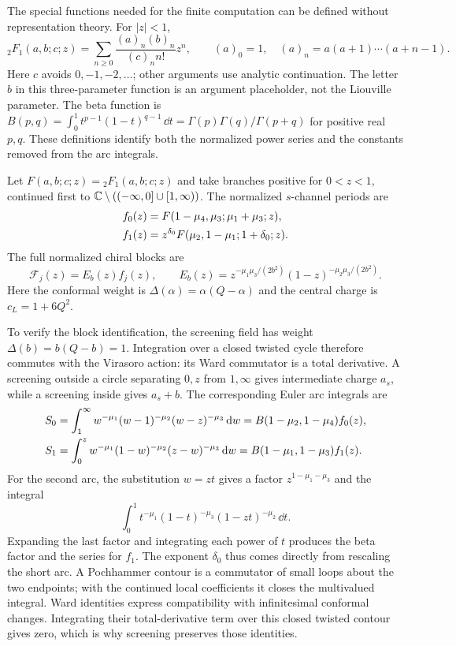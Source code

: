 The special functions needed for the finite computation can be
defined without representation theory. For $|z|<1$,
\[
 {}_2F_1(a,b;c;z)=\sum_{n\ge0}
       \frac{(a)_n(b)_n}{(c)_n n!}z^n,
 \qquad (a)_0=1,\quad (a)_n=a(a+1)\cdots(a+n-1).
\]
Here $c$ avoids $0,-1,-2,\ldots$; other arguments use analytic
continuation. The letter $b$ in this three-parameter function is
an argument placeholder, not the Liouville parameter.
The beta function is
$B(p,q)=\int_0^1t^{p-1}(1-t)^{q-1}\,\dd t
=\Gamma(p)\Gamma(q)/\Gamma(p+q)$ for positive real $p,q$.
These definitions identify both the normalized power series and
the constants removed from the arc integrals.

Let $F(a,b;c;z)={}_2F_1(a,b;c;z)$ and take branches positive
for $0<z<1$, continued first to
$\mathbb C\setminus(({-\infty},0]\cup[1,\infty))$.
The normalized $s$-channel periods are
\begin{align}
 f_0(z)&=F(1-\mu_4,\mu_3;\mu_1+\mu_3;z),\notag\\
 f_1(z)&=z^{\delta_0}
        F(\mu_2,1-\mu_1;1+\delta_0;z).
 \label{eq:screeningsbasis}
\end{align}
The full normalized chiral blocks are
\begin{equation}
 \mathcal F_j(z)=E_b(z)f_j(z),\qquad
 E_b(z)=z^{-\mu_1\mu_3/(2b^2)}
                  (1-z)^{-\mu_2\mu_3/(2b^2)}.
 \label{eq:screeningVirasoroblocks}
\end{equation}
Here the conformal weight is $\Delta(\alpha)=\alpha(Q-\alpha)$
and the central charge is $c_L=1+6Q^2$.

To verify the block identification, the screening field has
weight $\Delta(b)=b(Q-b)=1$. Integration over a closed twisted
cycle therefore commutes with the Virasoro action: its Ward
commutator is a total derivative. A screening outside a circle
separating $0,z$ from $1,\infty$ gives intermediate charge
$a_s$, while a screening inside gives $a_s+b$.
The corresponding Euler arc integrals are
\begin{align}
 S_0&=\int_1^\infty
   w^{-\mu_1}(w-1)^{-\mu_2}(w-z)^{-\mu_3}\mathop{}\!\mathrm d w
       =B(1-\mu_2,1-\mu_4)f_0(z),\notag\\
 S_1&=\int_0^z
   w^{-\mu_1}(1-w)^{-\mu_2}(z-w)^{-\mu_3}\mathop{}\!\mathrm d w
       =B(1-\mu_1,1-\mu_3)f_1(z).
 \label{eq:screeningEulerarcs}
\end{align}
For the second arc, the substitution $w=zt$ gives a factor
$z^{1-\mu_1-\mu_3}$ and the integral
\[
 \int_0^1t^{-\mu_1}(1-t)^{-\mu_3}(1-zt)^{-\mu_2}\,\dd t.
\]
Expanding the last factor and integrating each power of $t$
produces the beta factor and the series for $f_1$. The exponent
$\delta_0$ thus comes directly from rescaling the short arc.
A Pochhammer contour is a commutator of small loops about the two
endpoints; with the continued local coefficients it closes the
multivalued integral. Ward identities express compatibility with
infinitesimal conformal changes. Integrating their total-derivative
term over this closed twisted contour gives zero, which is why
screening preserves those identities.

